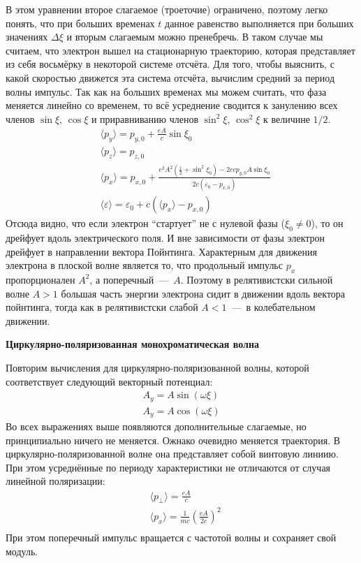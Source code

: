 \documentclass[10pt, a4paper]{article}
\begin{document}
В этом уравнении второе слагаемое (троеточие) ограничено, поэтому легко понять, что при больших временах $t$ данное равенство выполняется при больших значениях $\Delta\xi$ и вторым слагаемым можно пренебречь. В таком случае мы считаем, что электрон вышел на стационарную траекторию, которая представляет из себя восьмёрку в некоторой системе отсчёта. Для того, чтобы выяснить, с какой скоростью движется эта система отсчёта, вычислим средний за период волны импульс. Так как на больших временах мы можем считать, что фаза меняется линейно со временем, то всё усреднение сводится к занулению всех членов $\sin\xi$, $\cos\xi$ и приравниванию членов $\sin^2\xi$, $\cos^2\xi$ к величине $1/2$.
\begin{align*}
	&\langle p_y \rangle = p_{y,0} + \frac{eA}{c}\sin\xi_0 \\
	&\langle p_z \rangle = p_{z,0} \\
	&\langle p_x \rangle = p_{x,0} + \frac{e^2A^2\left( \frac{1}{2} + \sin^2\xi_0 \right) - 2ecp_{y,0}A\sin\xi_0}{2c\left( \varepsilon_0 - p_{x,0} \right)} \\
	&\langle \varepsilon \rangle = \varepsilon_0 + c\left( \langle p_x \rangle - p_{x,0} \right)
\end{align*}
Отсюда видно, что если электрон ``стартует'' не с нулевой фазы ($\xi_0 \neq 0$), то он дрейфует вдоль электрического поля. И вне зависимости от фазы электрон дрейфует в направлении вектора Пойнтинга. Характерным для движения электрона в плоской волне является то, что продольный импульс $p_x$ пропорционален $A^2$, а поперечный~---~$A$. Поэтому в релятивистски сильной волне $A>1$ большая часть энергии электрона сидит в движении вдоль вектора пойнтинга, тогда как в релятивистски слабой $A<1$~---~в колебательном движении.

\vspace{5mm}
\textbf{Циркулярно-поляризованная монохроматическая волна}

Повторим вычисления для циркулярно-поляризованной волны, которой соответствует следующий векторный потенциал:
\begin{align*}
	A_y = A\sin\left( \omega \xi \right) \\
	A_y = A\cos\left( \omega \xi \right)
\end{align*}
Во всех выражениях выше появляются дополнительные слагаемые, но принципиально ничего не меняется. Ожнако очевидно меняется траектория. В циркулярно-поляризованной волне она представляет собой винтовую линиию. При этом усреднённые по периоду характеристики не отличаются от случая линейной поляризации:
\begin{align*}
	&\langle p_\perp \rangle = \frac{eA}{c} \\
	&\langle p_x \rangle = \frac{1}{mc} \left( \frac{eA}{2c} \right)^2  \\
\end{align*}
При этом поперечный импульс вращается с частотой волны и сохраняет свой модуль.
\end{document}
